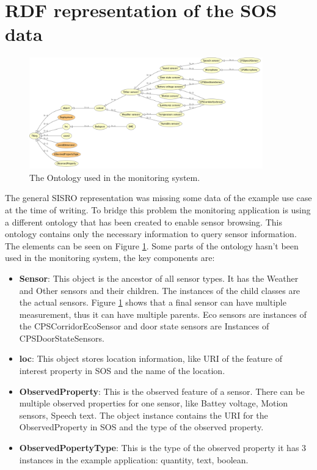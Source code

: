 \section{RDF representation of the SOS data}

\begin{figure}[h]
\centering
\includegraphics[width=0.9\textwidth]{figures/implrdf.png}
\caption{The Ontology used in the monitoring system.\label{fig:implrdf}}
\end{figure}

The general SISRO representation was missing some data of the example use case at the time of writing. To bridge this problem the monitoring application is using a different ontology that has been created to enable sensor browsing. This ontology contains only the necessary information to query sensor information. The elements can be seen on Figure \ref{fig:implrdf}. Some parts of the ontology hasn't been used in the monitoring system, the key components are:

\begin{itemize}
\item \textbf{Sensor}: This object is the ancestor of all sensor types. It has the Weather and Other sensors and their children. The instances of the child classes are the actual sensors. Figure \ref{fig:implrdf} shows that a final sensor can have multiple measurement, thus it can have multiple parents. Eco sensors are instances of the CPSCorridorEcoSensor and door state sensors are Instances of CPSDoorStateSensors. 
\item \textbf{loc}: This object stores location information, like URI of the feature of interest property in SOS and the name of the location. 
\item \textbf{ObservedProperty}: This is the observed feature of a sensor. There can be multiple observed properties for one sensor, like Battey voltage, Motion sensors, Speech text. The object instance contains the URI for the ObservedProperty in SOS and the type of the observed property.
\item \textbf{ObservedPopertyType}: This is the type of the observed property it has 3 instances in the example application: quantity, text, boolean.
\end{itemize}
 
